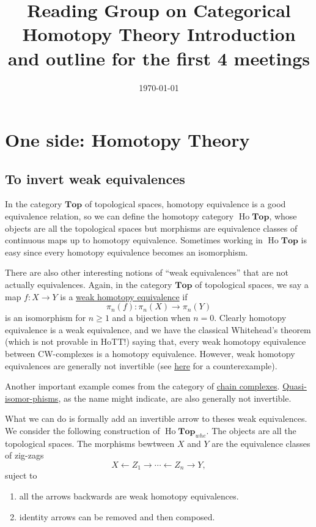 \documentclass[11pt]{article}
\title{
    Reading Group on Categorical Homotopy Theory
    \bigbreak
    \large Introduction and outline for the first 4 meetings
}
\author{}
\date{\today}
\newcommand{\Ho}{\operatorname{Ho}}
\newcommand{\Top}{\mathbf{Top}}
\begin{document}
\maketitle

\section{One side: Homotopy Theory}
\subsection{To invert weak equivalences}
In the category $\Top$ of topological spaces,
homotopy equivalence is a good equivalence relation,
so we can define the homotopy category $\Ho\Top$,
whose objects are all the topological spaces
but morphisms are equivalence classes of continuous maps up to homotopy equivalence.
Sometimes working in $\Ho\Top$ is easy since every homotopy equivalence becomes an isomorphism. 

There are also other interesting notions of ``weak equivalences'' that are not actually equivalences.
Again, in the category $\Top$ of topological spaces, we say a map $f : X \to Y$ is a
\href{https://ncatlab.org/nlab/show/weak+homotopy+equivalence}{weak homotopy equivalence} if
$$\pi_n(f) : \pi_n(X) \to \pi_n(Y)$$
is an isomorphism for $n\ge 1$ and a bijection when $n = 0$.
Clearly homotopy equivalence is a weak equivalence, and we have the classical Whitehead's theorem
(which is not provable in HoTT!) saying that,
every weak homotopy equivalence between CW-complexes is a homotopy equivalence.
However, weak homotopy equivalences are generally not invertible
(see \href{https://ncatlab.org/nlab/show/pseudocircle}{here} for a counterexample).

Another important example comes from the category of
\href{https://ncatlab.org/nlab/show/chain+complex}{chain complexes}.
\href{https://ncatlab.org/nlab/show/quasi-isomorphism}{Quasi-isomor-phisms},
as the name might indicate, are also generally not invertible.

What we can do is formally add an invertible arrow to theses weak equivalences.
We consider the following construction of $\Ho\Top_{whe}$.
The objects are all the topological spaces.
The morphisms bewtween $X$ and $Y$ are the equivalence classes of zig-zags
$$X \leftarrow Z_1 \rightarrow \cdots \leftarrow Z_{n} \to Y,$$
suject to
\begin{enumerate}
    \item all the arrows backwards are weak homotopy equivalences.
    \item identity arrows can be removed and then composed.
\end{enumerate}
\end{document}
